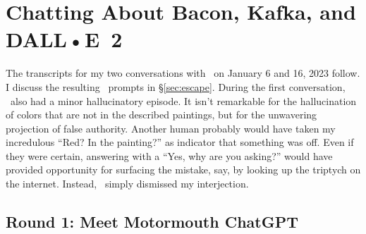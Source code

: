 \section{Chatting About Bacon, Kafka, and DALL•E~2}
\label{app:chatgpt}

The transcripts for my two conversations with \ChatGPT\ on January 6 and 16,
2023 follow. I discuss the resulting \DALLE\ prompts in \S\ref{sec:escape}.
During the first conversation, \ChatGPT\ also had a minor hallucinatory episode.
It isn't remarkable for the hallucination of colors that are not in the
described paintings, but for the unwavering projection of false authority.
Another human probably would have taken my incredulous ``Red? In the painting?''
as indicator that something was off. Even if they were certain, answering with a
``Yes, why are you asking?'' would have provided opportunity for surfacing the
mistake, say, by looking up the triptych on the internet. Instead, \ChatGPT\
simply dismissed my interjection.


\subsection{Round 1: Meet Motormouth ChatGPT}

